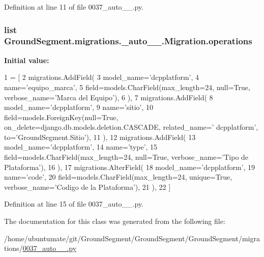 Definition at line 11 of file 0037\+\_\+auto\+\_\+\_.\+py.

\hypertarget{class_ground_segment_1_1migrations_1_10037__auto__20170131__1727_1_1_migration_a56e08d3bb9b43a4b0b341454ebc73ff4}{}
\subsubsection[{operations}]{\setlength{\rightskip}{0pt plus 5cm}list Ground\+Segment.\+migrations.\+\_\+auto\+\_\+\_.\+Migration.\+operations\hspace{0.3cm}{\ttfamily [static]}}\label{class_ground_segment_1_1migrations_1_10037__auto__20170131__1727_1_1_migration_a56e08d3bb9b43a4b0b341454ebc73ff4}
{\bfseries Initial value\+:}
\begin{DoxyCode}
1 = [
2         migrations.AddField(
3             model\_name=\textcolor{stringliteral}{'dcpplatform'},
4             name=\textcolor{stringliteral}{'equipo\_marca'},
5             field=models.CharField(max\_length=24, null=\textcolor{keyword}{True}, verbose\_name=\textcolor{stringliteral}{'Marca del Equipo'}),
6         ),
7         migrations.AddField(
8             model\_name=\textcolor{stringliteral}{'dcpplatform'},
9             name=\textcolor{stringliteral}{'sitio'},
10             field=models.ForeignKey(null=\textcolor{keyword}{True}, on\_delete=django.db.models.deletion.CASCADE, related\_name=\textcolor{stringliteral}{'
      dcpplatform'}, to=\textcolor{stringliteral}{'GroundSegment.Sitio'}),
11         ),
12         migrations.AddField(
13             model\_name=\textcolor{stringliteral}{'dcpplatform'},
14             name=\textcolor{stringliteral}{'type'},
15             field=models.CharField(max\_length=24, null=\textcolor{keyword}{True}, verbose\_name=\textcolor{stringliteral}{'Tipo de Plataforma'}),
16         ),
17         migrations.AlterField(
18             model\_name=\textcolor{stringliteral}{'dcpplatform'},
19             name=\textcolor{stringliteral}{'code'},
20             field=models.CharField(max\_length=24, unique=\textcolor{keyword}{True}, verbose\_name=\textcolor{stringliteral}{'Codigo de la Plataforma'}),
21         ),
22     ]
\end{DoxyCode}


Definition at line 15 of file 0037\+\_\+auto\+\_\+\_.\+py.



The documentation for this class was generated from the following file\+:\begin{DoxyCompactItemize}
\item 
/home/ubuntumate/git/\+Ground\+Segment/\+Ground\+Segment/\+Ground\+Segment/migrations/\hyperlink{0037__auto__20170131__1727_8py}{0037\+\_\+auto\+\_\+\_.\+py}\end{DoxyCompactItemize}
